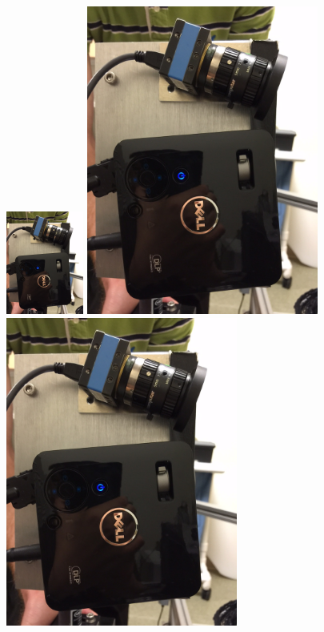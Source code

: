 \begin{figure}
\includegraphics[width = 1in]{./figures/4_Gen3/ProfilPic.jpg} 
\includegraphics[width = 3in]{./figures/4_Gen3/ProfilPic.jpg}\\
\includegraphics[width = 3in]{./figures/4_Gen3/ProfilPic.jpg}

\end{figure}
